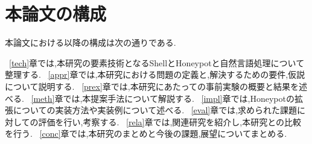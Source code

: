 \section{本論文の構成}
\label{intr:kosei}
本論文における以降の構成は次の通りである.

~\ref{tech}章では,本研究の要素技術となるShellとHoneypotと自然言語処理について整理する.
~\ref{appr}章では,本研究における問題の定義と,解決するための要件,仮説について説明する.
~\ref{prex}章では,本研究にあたっての事前実験の概要と結果を述べる.
~\ref{meth}章では,本提案手法について解説する.
~\ref{impl}章では,Honeypotの拡張についての実装方法や実装例について述べる.
~\ref{eval}章では,求められた課題に対しての評価を行い,考察する.
~\ref{rela}章では,関連研究を紹介し,本研究との比較を行う.
~\ref{conc}章では,本研究のまとめと今後の課題,展望についてまとめる.


